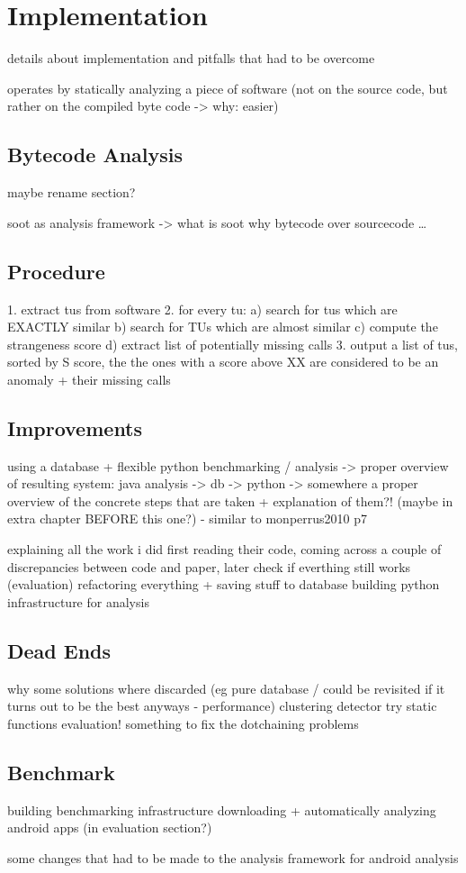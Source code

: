 \chapter{Implementation}
details about implementation and pitfalls that had to be overcome

operates by statically analyzing a piece of software
(not on the source code, but rather on the compiled byte code -> why: easier)

\section{Bytecode Analysis}
maybe rename section?

soot as analysis framework -> what is soot
why bytecode over sourcecode
\ldots

\section{Procedure}

1. extract tus from software
2. for every tu:
    a) search for tus which are EXACTLY similar
    b) search for TUs which are almost similar
    c) compute the strangeness score
    d) extract list of potentially missing calls
3. output a list of tus, sorted by S score, the the ones with a score above XX are considered to be an anomaly + their missing calls

\section{Improvements}
using a database + flexible python benchmarking / analysis
-> proper overview of resulting system: java analysis -> db -> python
-> somewhere a proper overview of the concrete steps that are taken + explanation of them?! (maybe in extra chapter BEFORE this one?) - similar to monperrus2010 p7

explaining all the work i did
    first reading their code, coming across a couple of discrepancies between code and paper, later check if everthing still works (evaluation)
    refactoring everything + saving stuff to database
    building python infrastructure for analysis

\section{Dead Ends}
why some solutions where discarded (eg pure database / could be revisited if it turns out to be the best anyways - performance)
    clustering detector try
static functions evaluation!
something to fix the dotchaining problems

\section{Benchmark}

building benchmarking infrastructure
downloading + automatically analyzing android apps (in evaluation section?)

some changes that had to be made to the analysis framework for android analysis
